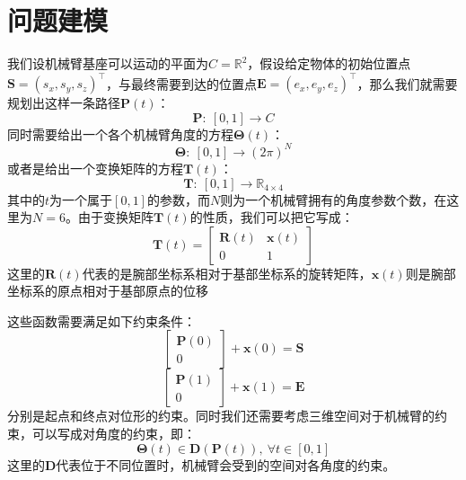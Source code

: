 \documentclass[conference]{IEEEtran}
\begin{document}
\section{问题建模}
我们设机械臂基座可以运动的平面为$C=\mathbb{R}^2$，假设给定物体的初始位置点$\boldsymbol{S}=(s_x, s_y, s_z)^\intercal$，与最终需要到达的位置点$\boldsymbol{E}=(e_x, e_y, e_z)^\intercal$，那么我们就需要规划出这样一条路径$\boldsymbol{P}(t)$：
\begin{equation}
    \boldsymbol{P}:\ [0, 1]\rightarrow C
\end{equation}
同时需要给出一个各个机械臂角度的方程$\boldsymbol{\Theta}(t)$：
\begin{equation}
    \boldsymbol{\Theta}:\ [0, 1]\rightarrow (2\pi)^N
\end{equation}
或者是给出一个变换矩阵的方程$\boldsymbol{T}(t)$：
\begin{equation}
    \boldsymbol{T}:\ [0, 1]\rightarrow \mathbb{R}_{4\times 4}
\end{equation}
其中的$t$为一个属于$\left[0, 1\right]$的参数，而$N$则为一个机械臂拥有的角度参数个数，在这里为$N=6$。由于变换矩阵$\boldsymbol{T}(t)$的性质，我们可以把它写成：
\begin{equation}
    \boldsymbol{T}(t) = 
    \left[\begin{array}{cc}
        \boldsymbol{R}(t) & \boldsymbol{x}(t) \\
        0 & 1
    \end{array}\right]
\end{equation}
这里的$\boldsymbol{R}(t)$代表的是腕部坐标系相对于基部坐标系的旋转矩阵，$\boldsymbol{x}(t)$则是腕部坐标系的原点相对于基部原点的位移

这些函数需要满足如下约束条件：
\begin{equation}
    \left[\begin{array}{c}
        \boldsymbol{P}(0) \\
        0
    \end{array}\right]
    + \boldsymbol{x}(0) = \boldsymbol{S}
\end{equation}
\begin{equation}
    \left[\begin{array}{c}
        \boldsymbol{P}(1) \\
        0
    \end{array}\right]
    + \boldsymbol{x}(1) = \boldsymbol{E}
\end{equation}
分别是起点和终点对位形的约束。同时我们还需要考虑三维空间对于机械臂的约束，可以写成对角度的约束，即：
\begin{equation}
    \boldsymbol{\Theta}(t)\in \boldsymbol{D}(\boldsymbol{P}(t)),\ \forall t\in[0, 1]
\end{equation}
这里的$\boldsymbol{D}$代表位于不同位置时，机械臂会受到的空间对各角度的约束。
\end{document}
